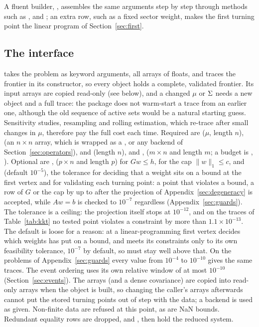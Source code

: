 A fluent builder, , assembles the same arguments step by step through
methods such as ,  and ; an extra  row,
such as a fixed sector weight, makes the first turning point the linear program of
Section~\ref{sec:first}.


\subsection{The interface}
\label{sec:api}

 takes the problem as keyword arguments, all  arrays of floats, and
traces the frontier in its constructor, so every  object holds a complete,
validated frontier. Its input arrays are copied read-only (see below), and a changed
$\mu$ or $\Sigma$ needs a new object and a full trace: the package does not warm-start
a trace from an earlier one, although the old sequence of active sets would be a
natural starting guess. Sensitivity studies, resampling and rolling estimation, which
re-trace after small changes in $\mu$, therefore pay the full cost each time. Required are  ($\mu$, length $n$),
 (an $n\times n$ array, which is wrapped as a ,
or any backend of Section~\ref{sec:operators}),  and 
(length $n$), and ,  ($m\times n$ and length $m$; a budget is
, ). Optional are , 
($p\times n$ and length $p$) for $Gw \le h$,  for the cap
$\lVert w\rVert_1 \le c$, and  (default $10^{-5}$), the tolerance for deciding
that a weight sits on a bound at the first vertex and for validating each turning point:
a point that violates a bound, a row of $G$ or the cap by up to  after the
projection of Appendix~\ref{sec:degeneracy} is accepted, while $Aw = b$ is checked to
$10^{-7}$ regardless (Appendix~\ref{sec:guards}). The tolerance is a ceiling: the
projection itself stops at $10^{-12}$, and on the traces of Table~\ref{tab:kkt} no
tested point violates a constraint by more than $1.1\times10^{-13}$. The default is
loose for a reason: at a linear-programming first vertex  decides which
weights  has put on a bound, and  meets its constraints only to its
own feasibility tolerance, $10^{-7}$ by default, so  must stay well above that.
On the problems of Appendix~\ref{sec:guards} every value from $10^{-4}$ to $10^{-10}$
gives the same traces. The event ordering
uses its own relative window of at most $10^{-10}$ (Section~\ref{sec:events}). The arrays (and a
dense covariance) are copied into read-only arrays when the object is built, so
changing the caller's arrays afterwards cannot put the stored turning points out of step
with the data; a backend is used as given. Non-finite data are refused at this point,
as are NaN bounds. Redundant equality rows are
dropped, and ,  then hold the reduced system.

